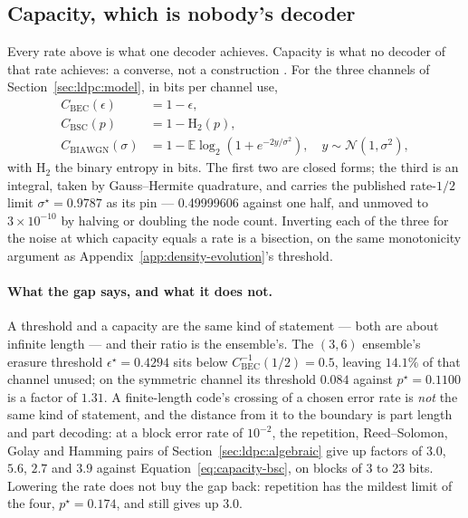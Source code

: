 \documentclass[11pt,a4paper]{article}
\begin{document}
\subsection{Capacity, which is nobody's decoder}
\label{sec:ldpc:capacity}
Every rate above is what one decoder achieves. Capacity is what no decoder of
that rate achieves: a converse, not a construction \citep{cover2006}. For the
three channels of Section~\ref{sec:ldpc:model}, in bits per channel use,
\begin{align}
  C_{\mathrm{BEC}}(\epsilon) &= 1 - \epsilon, \label{eq:capacity-bec} \\
  C_{\mathrm{BSC}}(p) &= 1 - \mathrm{H}_{2}(p), \label{eq:capacity-bsc} \\
  C_{\mathrm{BIAWGN}}(\sigma) &= 1 - \mathbb{E}
    \log_{2}\!\left(1 + e^{-2y/\sigma^{2}}\right),
    \quad y \sim \mathcal{N}(1, \sigma^{2}),
  \label{eq:capacity-biawgn}
\end{align}
with $\mathrm{H}_{2}$ the binary entropy in bits. The first two are closed
forms; the third is an integral, taken by Gauss--Hermite quadrature, and
carries the published rate-$1/2$ limit $\sigma^{\star} = 0.9787$
\citep{richardson2008} as its pin --- 0.49999606 against one half, and
unmoved to $3 \times 10^{-10}$ by halving or doubling the node count.
Inverting each of the three for the noise at which capacity equals a rate is
a bisection, on the same monotonicity argument as
Appendix~\ref{app:density-evolution}'s threshold.

\paragraph{What the gap says, and what it does not.} A threshold and a
capacity are the same kind of statement --- both are about infinite length ---
and their ratio is the ensemble's. The $(3,6)$ ensemble's erasure threshold
$\epsilon^{\star} = 0.4294$ sits below $C_{\mathrm{BEC}}^{-1}(1/2) = 0.5$,
leaving $14.1\%$ of that channel unused; on the symmetric channel its
threshold $0.084$ against $p^{\star} = 0.1100$ is a factor of $1.31$. A
finite-length code's crossing of a chosen error rate is \emph{not} the same
kind of statement, and the distance from it to the boundary is part length
and part decoding: at a block error rate of $10^{-2}$, the repetition,
Reed--Solomon, Golay and Hamming pairs of
Section~\ref{sec:ldpc:algebraic} give up factors of $3.0$, $5.6$, $2.7$ and
$3.9$ against Equation~\ref{eq:capacity-bsc}, on blocks of 3 to 23 bits.
Lowering the rate does not buy the gap back: repetition has the mildest limit
of the four, $p^{\star} = 0.174$, and still gives up $3.0$.
\end{document}
